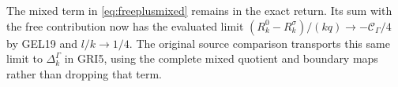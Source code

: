 The mixed term in \eqref{eq:freeplusmixed} remains in the exact
return. Its sum with the free contribution now has the evaluated
limit $(R_k^0-R_k^\sigma)/(kq)\to-\mathcal C_\Gamma/4$ by
GEL19 and $l/k\to1/4$. The original source comparison transports
this same limit to $\Delta_k^\Gamma$ in GRI5, using the complete
mixed quotient and boundary maps rather than dropping that term.
